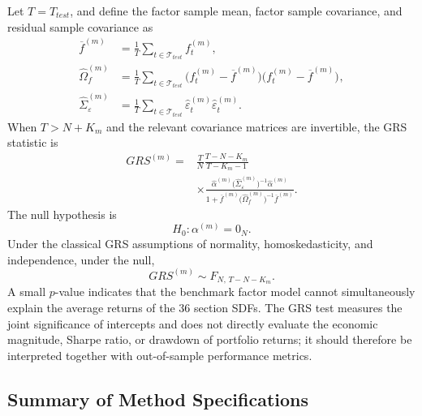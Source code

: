\documentclass[12pt]{article}
\def\bm#1{#1}%
\def\mathrm#1{#1}%
\def\top{}%
\begin{document}
Let \(T=T_{\mathrm{test}}\), and define the factor sample mean, factor sample covariance, and residual sample covariance as
\begin{align}
  \overline{\bm f}^{(m)}
  &=
  \frac{1}{T}
  \sum_{t\in\mathcal T_{\mathrm{test}}}
  \bm f_t^{(m)},
  \label{eq:factor_sample_mean}\\
  \widehat{\bm\Omega}_{f}^{(m)}
  &=
  \frac{1}{T}
  \sum_{t\in\mathcal T_{\mathrm{test}}}
  \bigl(
    \bm f_t^{(m)}-\overline{\bm f}^{(m)}
  \bigr)
  \bigl(
    \bm f_t^{(m)}-\overline{\bm f}^{(m)}
  \bigr)^{\top},
  \label{eq:factor_covariance}\\
  \widehat{\bm\Sigma}_{\varepsilon}^{(m)}
  &=
  \frac{1}{T}
  \sum_{t\in\mathcal T_{\mathrm{test}}}
  \widehat{\bm\varepsilon}_t^{(m)}
  \widehat{\bm\varepsilon}_t^{(m)\top}.
  \label{eq:residual_covariance}
\end{align}
When \(T>N+K_m\) and the relevant covariance matrices are invertible, the GRS statistic is
\begin{equation}
  \begin{aligned}
  \mathrm{GRS}^{(m)}
  ={}&
  \frac{T}{N}
  \frac{T-N-K_m}{T-K_m-1}\\
  &\times
  \frac{
    \widehat{\bm\alpha}^{(m)\top}
    \bigl(\widehat{\bm\Sigma}_{\varepsilon}^{(m)}\bigr)^{-1}
    \widehat{\bm\alpha}^{(m)}
  }{
    1+
    \overline{\bm f}^{(m)\top}
    \bigl(\widehat{\bm\Omega}_{f}^{(m)}\bigr)^{-1}
    \overline{\bm f}^{(m)}
  }.
  \end{aligned}
  \label{eq:grs_statistic}
\end{equation}
The null hypothesis is
\begin{equation}
  H_0:
  \bm\alpha^{(m)}=\bm 0_N.
  \label{eq:grs_null}
\end{equation}
Under the classical GRS assumptions of normality, homoskedasticity, and independence, under the null,
\begin{equation}
  \mathrm{GRS}^{(m)}
  \sim
  F_{N,\,T-N-K_m}.
  \label{eq:grs_distribution}
\end{equation}
A small \(p\)-value indicates that the benchmark factor model cannot simultaneously explain the average returns of the 36 section SDFs. The GRS test measures the joint significance of intercepts and does not directly evaluate the economic magnitude, Sharpe ratio, or drawdown of portfolio returns; it should therefore be interpreted together with out-of-sample performance metrics.

\subsection{Summary of Method Specifications}
\label{subsec:method_summary}
\end{document}
